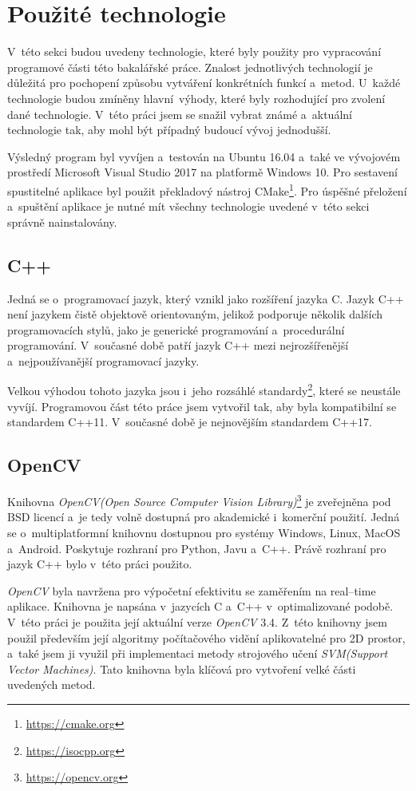 \section{Použité technologie}
V~této sekci budou uvedeny technologie, které byly použity pro vypracování programové části této bakalářské práce. Znalost jednotlivých technologií je důležitá pro pochopení způsobu vytváření konkrétních funkcí a~metod. U~každé technologie budou zmíněny hlavní~výhody, které byly rozhodující pro zvolení dané technologie. V~této práci jsem se snažil vybrat známé a~aktuální technologie tak, aby mohl být případný budoucí vývoj jednodušší.

Výsledný program byl vyvíjen a~testován na Ubuntu 16.04 a~také ve vývojovém prostředí Microsoft Visual Studio 2017 na platformě Windows 10. Pro sestavení spustitelné aplikace byl použit překladový nástroj CMake\footnote{\url{https://cmake.org}}. Pro úspěšné přeložení a~spuštění aplikace je nutné mít všechny technologie uvedené v~této sekci správně nainstalovány.

\subsection{C++}
Jedná se o~programovací jazyk, který vznikl jako rozšíření jazyka C. Jazyk C++ není jazykem čistě objektově orientovaným, jelikož podporuje několik dalších programovacích stylů, jako je generické programování a~procedurální programování. V~současné době patří jazyk C++ mezi nejrozšířenější a~nejpoužívanější programovací jazyky.

Velkou výhodou tohoto jazyka jsou i~jeho rozsáhlé standardy\footnote{\url{https://isocpp.org}}, které se neustále vyvíjí. Programovou část této práce jsem vytvořil tak, aby byla kompatibilní se standardem C++11. V~současné době je nejnovějším standardem C++17.

\subsection{OpenCV}
Knihovna \emph{OpenCV(Open Source Computer Vision Library)}\footnote{\url{https://opencv.org}} je zveřejněna pod BSD licencí a~je tedy volně dostupná pro akademické i~komerční použití. Jedná se o~multiplatformní knihovnu dostupnou pro systémy Windows, Linux, MacOS a~Android. Poskytuje rozhraní pro Python, Javu a~C++. Právě rozhraní pro jazyk C++ bylo v~této práci použito.

\emph{OpenCV} byla navržena pro výpočetní efektivitu se zaměřením na real--time aplikace. Knihovna je napsána v~jazycích C a~C++ v~optimalizované podobě. V~této práci je použita její aktuální verze \emph{OpenCV} 3.4. Z~této knihovny jsem použil především její algoritmy počítačového vidění aplikovatelné pro 2D prostor, a~také jsem ji využil při implementaci metody strojového učení \emph{SVM(Support Vector Machines)}. Tato knihovna byla klíčová pro vytvoření velké části uvedených metod.

